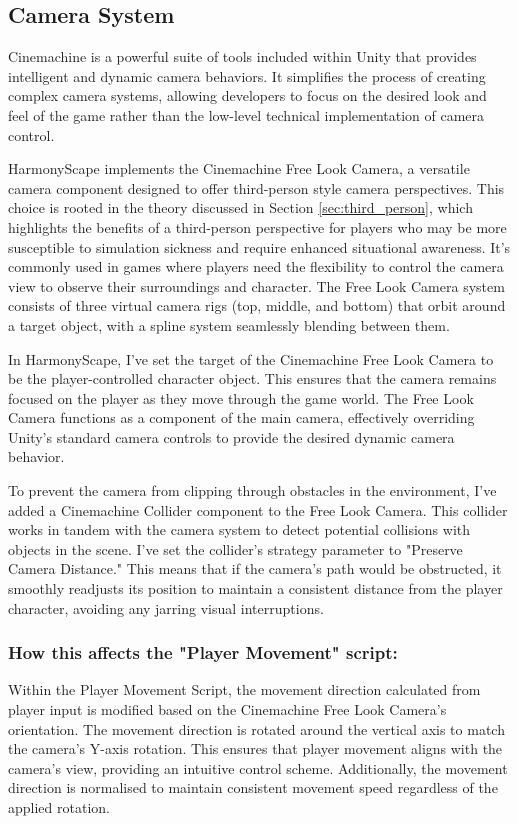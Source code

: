 \documentclass{l4proj}
\begin{document}
\subsection{Camera System}
Cinemachine is a powerful suite of tools included within Unity that provides intelligent and dynamic camera behaviors. It simplifies the process of creating complex camera systems, allowing developers to focus on the desired look and feel of the game rather than the low-level technical implementation of camera control.

HarmonyScape implements the Cinemachine Free Look Camera, a versatile camera component designed to offer third-person style camera perspectives. This choice is rooted in the theory discussed in Section \ref{sec:third_person}, which highlights the benefits of a third-person perspective for players who may be more susceptible to simulation sickness and require enhanced situational awareness. It's commonly used in games where players need the flexibility to control the camera view to observe their surroundings and character. The Free Look Camera system consists of three virtual camera rigs (top, middle, and bottom) that orbit around a target object, with a spline system seamlessly blending between them.

In HarmonyScape, I've set the target of the Cinemachine Free Look Camera to be the player-controlled character object. This ensures that the camera remains focused on the player as they move through the game world. The Free Look Camera functions as a component of the main camera, effectively overriding Unity's standard camera controls to provide the desired dynamic camera behavior.

To prevent the camera from clipping through obstacles in the environment, I've added a Cinemachine Collider component to the Free Look Camera. This collider works in tandem with the camera system to detect potential collisions with objects in the scene. I've set the collider's strategy parameter to "Preserve Camera Distance." This means that if the camera's path would be obstructed, it smoothly readjusts its position to maintain a consistent distance from the player character, avoiding any jarring visual interruptions.

\subsubsection{How this affects the "Player Movement" script:} Within the Player Movement Script, the movement direction calculated from player input is modified based on the Cinemachine Free Look Camera's orientation. The movement direction is rotated around the vertical axis to match the camera's Y-axis rotation. This ensures that player movement aligns with the camera's view, providing an intuitive control scheme. Additionally, the movement direction is normalised to maintain consistent movement speed regardless of the applied rotation.
\end{document}
